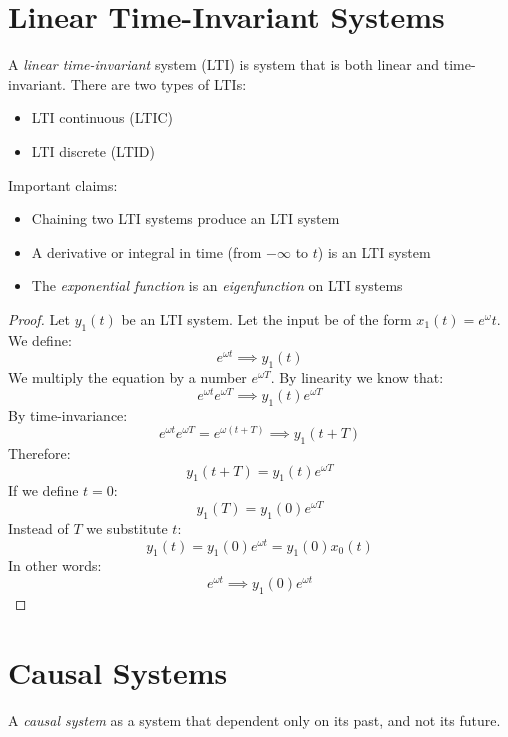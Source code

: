\documentclass[00_complete]{subfiles}
\begin{document}
\section{Linear Time-Invariant Systems}
\begin{definition}
    A \textit{linear time-invariant} system (LTI) is system that is both linear
    and time-invariant.
    There are two types of LTIs:
    \begin{itemize}
        \item LTI continuous (LTIC)
        \item LTI discrete (LTID)
    \end{itemize}
\end{definition}
\begin{claim}
    Important claims:
    \begin{itemize}
        \item Chaining two LTI systems produce an LTI system
        \item A derivative or integral in time (from $-\infty$ to $t$) is an LTI
            system
        \item The \textit{exponential function} is an \textit{eigenfunction} on
            LTI systems
    \end{itemize}
\end{claim}
\begin{proof}
Let $y_1(t)$ be an LTI system. Let the input be of the form $x_1(t)=e^{\omega}t$.
We define:
$$e^{\omega t}\implies y_1(t)$$
We multiply the equation by a number $ e^{\omega T} $. By linearity we know
that:
$$ e^{\omega t}e^{\omega T} \implies y_1(t)e^{\omega T} $$
By time-invariance:
$$ e^{\omega t}e^{\omega T} = e^{\omega(t+T)}\implies y_1(t+T) $$
Therefore:
$$y_1(t+T)=y_1(t)e^{\omega T}$$
If we define $t=0$:
$$y_1(T) = y_1(0)e^{\omega T}$$
Instead of $T$ we substitute $t$:
$$ y_1(t)=y_1(0)e^{\omega t}=y_1(0)x_0(t) $$
In other words:
$$ e^{\omega t} \implies y_1(0)e^{\omega t}$$
\end{proof}
\section{Causal Systems}
\begin{definition}
    A \textit{causal system} as a system that dependent only on its past, and
    not its future.
\end{definition}
\end{document}
